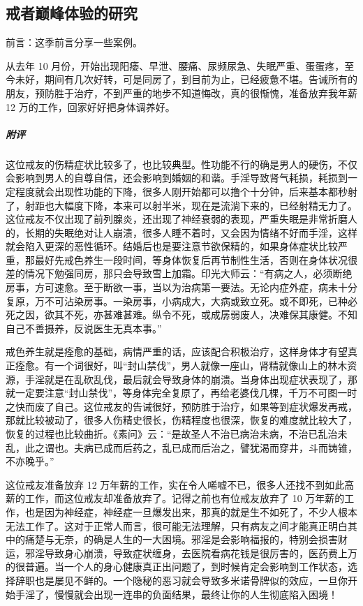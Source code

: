 \subsection{戒者巅峰体验的研究}

前言：这季前言分享一些案例。

\begin{case}
    从去年 10 月份，开始出现阳痿、早泄、腰痛、尿频尿急、失眠严重、蛋蛋疼，至今未好，期间有几次好转，可是同房了，到目前为止，已经疲惫不堪。告诫所有的朋友，预防胜于治疗，不到严重的地步不知道悔改，真的很惭愧，准备放弃我年薪 12 万的工作，回家好好把身体调养好。
    \subparagraph{附评} 这位戒友的伤精症状比较多了，也比较典型。性功能不行的确是男人的硬伤，不仅会影响到男人的自尊自信，还会影响到婚姻的和谐。手淫导致肾气耗损，耗损到一定程度就会出现性功能的下降，很多人刚开始都可以撸个十分钟，后来基本都秒射了，射距也大幅度下降，本来可以射半米，现在是流淌下来的，已经射精无力了。这位戒友不仅出现了前列腺炎，还出现了神经衰弱的表现，严重失眠是非常折磨人的，长期的失眠绝对让人崩溃，很多人睡不着时，又会因为情绪不好而手淫，这样就会陷入更深的恶性循环。结婚后也是要注意节欲保精的，如果身体症状比较严重，那最好先戒色养生一段时间，等身体恢复后再节制性生活，否则在身体状况很差的情况下勉强同房，那只会导致雪上加霜。印光大师云：“有病之人，必须断绝房事，方可速愈。至于断欲一事，当以为治病第一要法。无论内症外症，病未十分复原，万不可沾染房事。一染房事，小病成大，大病或致立死。或不即死，已种必死之因，欲其不死，亦甚难甚难。纵令不死，或成孱弱废人，决难保其康健。不知自己不善摄养，反说医生无真本事。”

    戒色养生就是痊愈的基础，病情严重的话，应该配合积极治疗，这样身体才有望真正痊愈。有一个词很好，叫“封山禁伐”，男人就像一座山，肾精就像山上的林木资源，手淫就是在乱砍乱伐，最后就会导致身体的崩溃。当身体出现症状表现了，那就一定要注意“封山禁伐”，等身体完全复原了，再给老婆伐几棵，千万不可图一时之快而废了自己。这位戒友的告诫很好，预防胜于治疗，如果等到症状爆发再戒，那就比较被动了，很多人伤精史很长，伤精程度也很深，恢复的难度就比较大了，恢复的过程也比较曲折。《素问》云：“是故圣人不治已病治未病，不治已乱治未乱，此之谓也。夫病已成而后药之，乱已成而后治之，譬犹渴而穿井，斗而铸锥，不亦晚乎。”

    这位戒友准备放弃 12 万年薪的工作，实在令人唏嘘不已，很多人还找不到如此高薪的工作，而这位戒友却准备放弃了。记得之前也有位戒友放弃了 10 万年薪的工作，也是因为神经症，神经症一旦爆发出来，那真的就是生不如死了，不少人根本无法工作了。这对于正常人而言，很可能无法理解，只有病友之间才能真正明白其中的痛楚与无奈，的确是人生的一大困境。邪淫是会影响福报的，特别会损害财运，邪淫导致身心崩溃，导致症状缠身，去医院看病花钱是很厉害的，医药费上万的很普遍。当一个人的身心健康真正出问题了，到时候肯定会影响到工作状态，选择辞职也是屡见不鲜的。一个隐秘的恶习就会导致多米诺骨牌似的效应，一旦你开始手淫了，慢慢就会出现一连串的负面结果，最终让你的人生彻底陷入困境！
\end{case}

